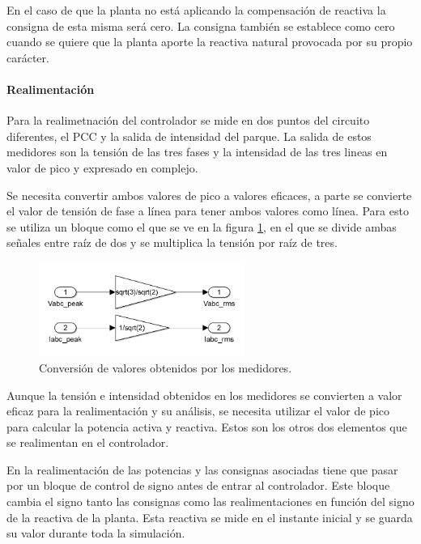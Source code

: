 \documentclass{book}
\begin{document}
En el caso de que la planta no est\'a aplicando la compensaci\'on de reactiva la consigna de esta misma ser\'a cero. La consigna tambi\'en se establece como cero cuando se quiere que la planta aporte la reactiva natural provocada por su propio car\'acter. \par

\paragraph{Realimentaci\'on}

Para la realimetnaci\'on del controlador se mide en dos puntos del circuito diferentes, el PCC y la salida de intensidad del parque. La salida de estos medidores son la tensi\'on de las tres fases y la intensidad de las tres lineas en valor de pico y expresado en complejo. \par

Se necesita convertir ambos valores de pico a valores eficaces, a parte se convierte el valor de tensi\'on de fase a l\'inea para tener ambos valores como l\'inea. Para esto se utiliza un bloque como el que se ve en la figura \ref{peak2rms}, en el que se divide ambas señales entre ra\'iz de dos y se multiplica la tensi\'on por ra\'iz de tres. \par

\begin{figure}[h!]
\centering
\includegraphics[width=0.6\textwidth]{peak2rms.PNG}
\caption{Conversi\'on de valores obtenidos por los medidores. }
\label{peak2rms}
\end{figure} \par

Aunque la tensi\'on e intensidad obtenidos en los medidores se convierten a valor eficaz para la realimentaci\'on y su an\'alisis, se necesita utilizar el valor de pico para calcular la potencia activa y reactiva. Estos son los otros dos elementos que se realimentan en el controlador.  \par

En la realimentaci\'on de las potencias y las consignas asociadas tiene que pasar por un bloque de control de signo antes de entrar al controlador. Este bloque cambia el signo tanto las consignas como las realimentaciones en funci\'on del signo de la reactiva de la planta. Esta reactiva se mide en el instante inicial y se guarda su valor durante toda la simulaci\'on. \par
\end{document}
